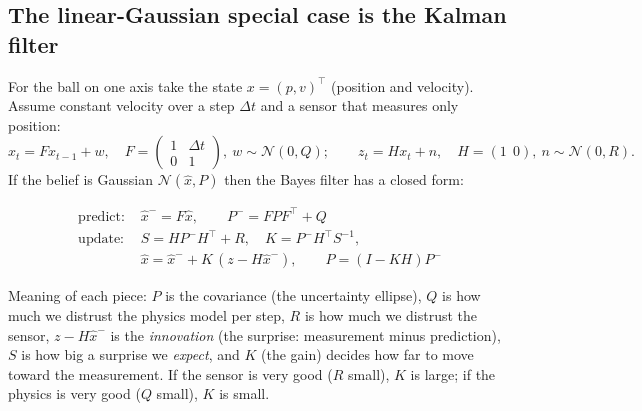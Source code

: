 \documentclass[11pt,a4paper]{article}
\begin{document}
\subsection{The linear-Gaussian special case is the Kalman filter}
For the ball on one axis take the state $x=(p,v)^\top$ (position and velocity). Assume constant
velocity over a step $\Delta t$ and a sensor that measures only position:
\[
x_{t}=Fx_{t-1}+w,\quad F=\begin{pmatrix}1&\Delta t\\0&1\end{pmatrix},\ w\sim\mathcal N(0,Q);\qquad
z_t=Hx_t+n,\quad H=(1\ \ 0),\ n\sim\mathcal N(0,R).
\]
If the belief is Gaussian $\mathcal N(\hat x,P)$ then the Bayes filter has a closed form:
\begin{eqbox}
\begin{align*}
\text{predict: } & \hat x^-=F\hat x,\qquad P^-=FPF^\top+Q\\
\text{update: } & S=HP^-H^\top+R,\quad K=P^-H^\top S^{-1},\\
& \hat x=\hat x^-+K\,(z-H\hat x^-),\qquad P=(I-KH)P^-
\end{align*}
\end{eqbox}
Meaning of each piece: $P$ is the covariance (the uncertainty ellipse), $Q$ is how much we distrust
the physics model per step, $R$ is how much we distrust the sensor, $z-H\hat x^-$ is the
\emph{innovation} (the surprise: measurement minus prediction), $S$ is how big a surprise we
\emph{expect}, and $K$ (the gain) decides how far to move toward the measurement. If the sensor is
very good ($R$ small), $K$ is large; if the physics is very good ($Q$ small), $K$ is small.
\end{document}
